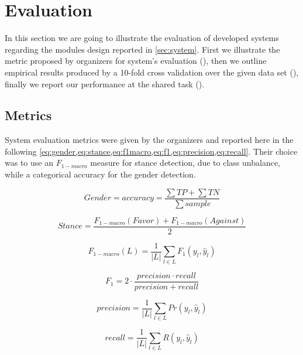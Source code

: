 \section{Evaluation} \label{sec:evaluation}

In this section we are going to illustrate the evaluation of developed systems regarding the modules design reported in \cref{sec:system}.
First we illustrate the metric proposed by organizers for system's evaluation (), then we outline empirical results produced by a 10-fold cross validation over the given data set (), finally we report our performance at the shared task ().

\subsection{Metrics} \label{subsec:metric}

System evaluation metrics were given by the organizers and reported here in the following \cref{eq:gender,eq:stance,eq:f1macro,eq:f1,eq:precision,eq:recall}. Their choice was to use an $F_{1-macro}$ measure for stance detection, due to class unbalance, while a categorical accuracy for the gender detection.

\begin{multicols}{2}
\begin{equation}  \label{eq:gender}
Gender = accuracy = \frac{\sum TP + \sum TN}{\sum sample}
\end{equation}

\begin{equation}  \label{eq:stance}
Stance = \frac{F_{1-macro}(Favor) + F_{1-macro}(Against)}{2}
\end{equation}

\begin{equation}  \label{eq:f1macro}
F_{1-macro}(L) = \frac{1}{|L|} \displaystyle\sum_{l\in L} F_1(y_l, \hat{y}_l)
\end{equation}	
	
\begin{equation} \label{eq:f1}
F_1 = 2 \cdot \frac{precision \cdot recall }{precision + recall}
\end{equation}

\begin{equation} \label{eq:precision}
precision = \frac{1}{|L|} \displaystyle\sum_{l\in L} Pr(y_l, \hat{y}_l)
\end{equation}

\begin{equation} \label{eq:recall}
recall = \frac{1}{|L|} \displaystyle\sum_{l\in L} R(y_l, \hat{y}_l)
\end{equation}
\end{multicols}

